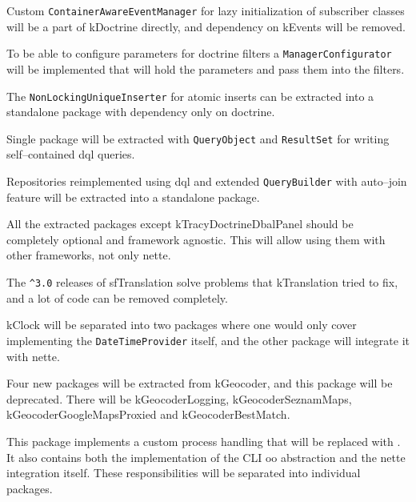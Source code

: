 Custom \lstinline{ContainerAwareEventManager} for lazy initialization of subscriber classes will be a part of \gls{kDoctrine} directly, and dependency on \gls{kEvents} will be removed.

To be able to configure parameters for \gls{doctrine} filters a \lstinline{ManagerConfigurator} will be implemented that will hold the parameters and pass them into the filters.

The \lstinline{NonLockingUniqueInserter} for atomic inserts can be extracted into a standalone package with dependency only on \gls{doctrine}.

Single package will be extracted with \lstinline{QueryObject} and \lstinline{ResultSet} for writing self--contained \gls{dql} queries.

Repositories reimplemented using \gls{dql} and extended \lstinline{QueryBuilder} with auto--join feature will be extracted into a standalone package.

All the extracted packages except \gls{kTracyDoctrineDbalPanel} should be completely optional and framework agnostic. This will allow using them with other frameworks, not only \gls{nette}.


The \lstinline{^3.0} releases of \gls{sfTranslation} solve problems that \gls{kTranslation} tried to fix, and a lot of code can be removed completely.


\gls{kClock} will be separated into two packages where one would only cover implementing the \lstinline{DateTimeProvider} itself, and the other package will integrate it with \gls{nette}.


Four new packages will be extracted from \gls{kGeocoder}, and this package will be deprecated. There will be \gls{kGeocoderLogging}, \gls{kGeocoderSeznamMaps}, \gls{kGeocoderGoogleMapsProxied} and \gls{kGeocoderBestMatch}.


This package implements a custom process handling that will be replaced with . It also contains both the implementation of the CLI \gls{oo} abstraction and the \gls{nette} integration itself. These responsibilities will be separated into individual packages.
